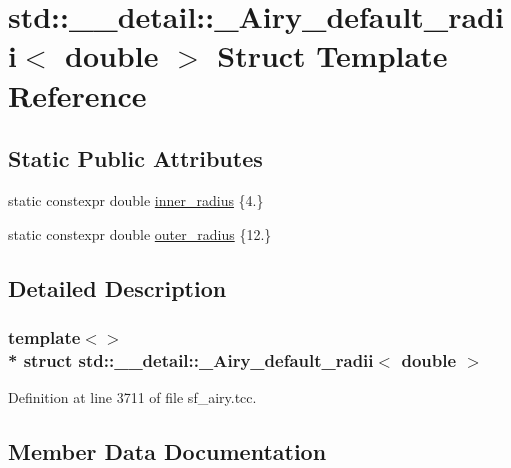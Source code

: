 \hypertarget{structstd_1_1____detail_1_1__Airy__default__radii_3_01double_01_4}{}\section{std\+:\+:\+\_\+\+\_\+detail\+:\+:\+\_\+\+Airy\+\_\+default\+\_\+radii$<$ double $>$ Struct Template Reference}
\label{structstd_1_1____detail_1_1__Airy__default__radii_3_01double_01_4}
\subsection*{Static Public Attributes}
\begin{DoxyCompactItemize}
\item 
static constexpr double \hyperlink{structstd_1_1____detail_1_1__Airy__default__radii_3_01double_01_4_a1c16ae812de7fce0a39bc3b094767b87}{inner\+\_\+radius} \{4.\}
\item 
static constexpr double \hyperlink{structstd_1_1____detail_1_1__Airy__default__radii_3_01double_01_4_a0d0c981d84c034afb18aa533bd6a9a52}{outer\+\_\+radius} \{12.\}
\end{DoxyCompactItemize}


\subsection{Detailed Description}
\subsubsection*{template$<$$>$\\*
struct std\+::\+\_\+\+\_\+detail\+::\+\_\+\+Airy\+\_\+default\+\_\+radii$<$ double $>$}



Definition at line 3711 of file sf\+\_\+airy.\+tcc.



\subsection{Member Data Documentation}
